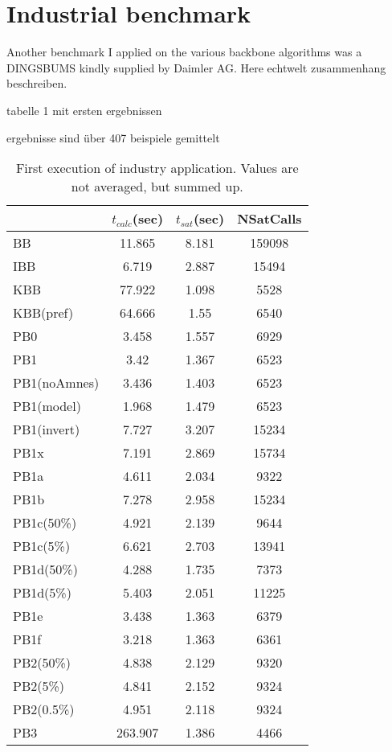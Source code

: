 \section{Industrial benchmark}

Another benchmark I applied on the various backbone algorithms was a DINGSBUMS kindly supplied by Daimler AG. Here echtwelt zusammenhang beschreiben.



tabelle 1 mit ersten ergebnissen

ergebnisse sind über 407 beispiele gemittelt

\begin{table}[h!] %

\label{tab:vonThore1} %
\begin{tabular}{l| c c c }
&	$t_{calc}$(sec) &	$t_{sat}$(sec)	& NSatCalls \\
\hline
BB & 11.865 & 8.181 & 159098 \\
IBB & 6.719 & 2.887 & 15494 \\
KBB & 77.922 & 1.098 & 5528 \\
KBB(pref) & 64.666 & 1.55 & 6540 \\
PB0 & 3.458 & 1.557 & 6929 \\
PB1 & 3.42 & 1.367 & 6523 \\
PB1(noAmnes) & 3.436 & 1.403 & 6523 \\
PB1(model) & 1.968 & 1.479 & 6523 \\
PB1(invert) & 7.727 & 3.207 & 15234 \\
PB1x & 7.191 & 2.869 & 15734 \\
PB1a & 4.611 & 2.034 & 9322 \\
PB1b & 7.278 & 2.958 & 15234 \\
PB1c(50\%) & 4.921 & 2.139 & 9644 \\
PB1c(5\%) & 6.621 & 2.703 & 13941 \\
PB1d(50\%) & 4.288 & 1.735 & 7373 \\
PB1d(5\%) & 5.403 & 2.051 & 11225 \\
PB1e & 3.438 & 1.363 & 6379 \\
PB1f & 3.218 & 1.363 & 6361 \\
PB2(50\%) & 4.838 & 2.129 & 9320 \\
PB2(5\%) & 4.841 & 2.152 & 9324 \\
PB2(0.5\%) & 4.951 & 2.118 & 9324 \\
PB3 & 263.907 & 1.386 & 4466 \\
\end{tabular}
\caption{First execution of industry application. Values are not averaged, but summed up.}
\end{table}

